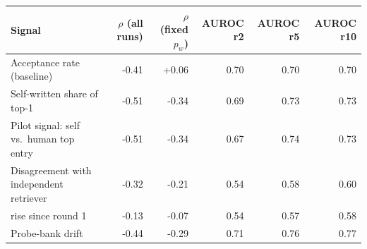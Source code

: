 \begin{tabular}{lrrrrr}\toprule Signal & $\rho$ (all runs) & $\rho$ (fixed $p_w$) & AUROC r2 & AUROC r5 & AUROC r10\\\midrule
Acceptance rate (baseline) & -0.41 & +0.06 & 0.70 & 0.70 & 0.70\\
Self-written share of top-1 & -0.51 & -0.34 & 0.69 & 0.73 & 0.73\\
Pilot signal: self vs.\ human top entry & -0.51 & -0.34 & 0.67 & 0.74 & 0.73\\
Disagreement with independent retriever & -0.32 & -0.21 & 0.54 & 0.58 & 0.60\\
\quad rise since round 1 & -0.13 & -0.07 & 0.54 & 0.57 & 0.58\\
Probe-bank drift & -0.44 & -0.29 & 0.71 & 0.76 & 0.77\\
\bottomrule\end{tabular}